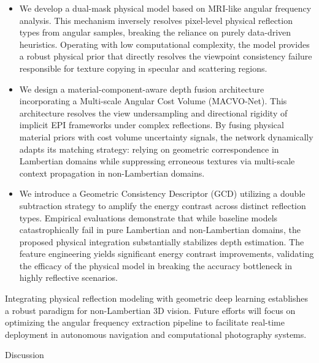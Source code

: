 \documentclass[lettersize,journal]{IEEEtran}
\begin{document}
\begin{itemize}
    \item We develop a dual-mask physical model based on MRI-like angular frequency analysis. This mechanism inversely resolves pixel-level physical reflection types from angular samples, breaking the reliance on purely data-driven heuristics. Operating with low computational complexity, the model provides a robust physical prior that directly resolves the viewpoint consistency failure responsible for texture copying in specular and scattering regions.
    \item We design a material-component-aware depth fusion architecture incorporating a Multi-scale Angular Cost Volume (MACVO-Net). This architecture resolves the view undersampling and directional rigidity of implicit EPI frameworks under complex reflections. By fusing physical material priors with cost volume uncertainty signals, the network dynamically adapts its matching strategy: relying on geometric correspondence in Lambertian domains while suppressing erroneous textures via multi-scale context propagation in non-Lambertian domains.
    \item We introduce a Geometric Consistency Descriptor (GCD) utilizing a double subtraction strategy to amplify the energy contrast across distinct reflection types. Empirical evaluations demonstrate that while baseline models catastrophically fail in pure Lambertian and non-Lambertian domains, the proposed physical integration substantially stabilizes depth estimation. The feature engineering yields significant energy contrast improvements, validating the efficacy of the physical model in breaking the accuracy bottleneck in highly reflective scenarios.
\end{itemize}

Integrating physical reflection modeling with geometric deep learning establishes a robust paradigm for non-Lambertian 3D vision. Future efforts will focus on optimizing the angular frequency extraction pipeline to facilitate real-time deployment in autonomous navigation and computational photography systems.

Discussion
\end{document}
